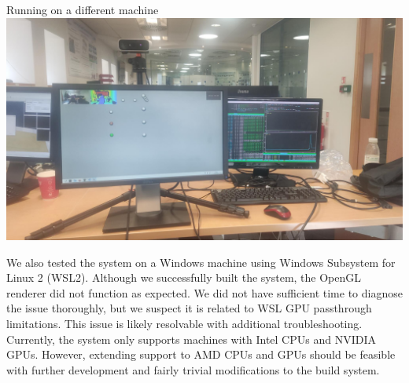 \begin{figureBox}[label={fig:other-machine}, width=0.7\linewidth]{Running on a different machine}
	\includegraphics[width=1.0\linewidth]{./evaluation/figures/other-device.jpeg}
\end{figureBox}

We also tested the system on a Windows machine using Windows Subsystem for Linux 2 (WSL2). Although we successfully built the system, the OpenGL renderer did not function as expected. We did not have sufficient time to diagnose the issue thoroughly, but we suspect it is related to WSL GPU passthrough limitations. This issue is likely resolvable with additional troubleshooting. \\

Currently, the system only supports machines with Intel CPUs and NVIDIA GPUs. However, extending support to AMD CPUs and GPUs should be feasible with further development and fairly trivial modifications to the build system.

